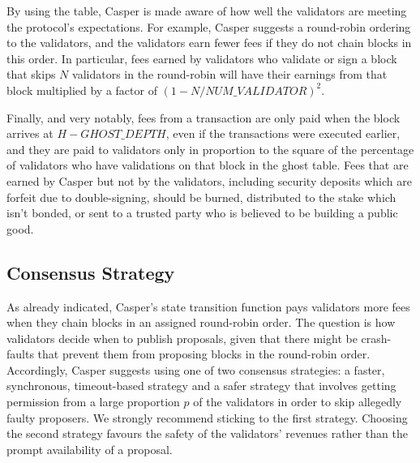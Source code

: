 \documentclass[11pt,a4paper]{article}
\begin{document}
By using the table, Casper is made aware of how well the validators are meeting the protocol's expectations. For example, Casper suggests a round-robin ordering to the validators, and the validators earn fewer fees if they do not chain blocks in this order. In particular, fees earned by validators who validate or sign a block that skips $N$ validators in the round-robin will have their earnings from that block multiplied by a factor of $(1 - N/NUM\_VALIDATOR)^2$. 

Finally, and very notably, fees from a transaction are only paid when the block arrives at $H - GHOST\_DEPTH$, even if the transactions were executed earlier, and they are paid to validators only in proportion to the square of the percentage of validators who have validations on that block in the ghost table. Fees that are earned by Casper but not by the validators, including security deposits which are forfeit due to double-signing, should be burned, distributed to the stake which isn't bonded, or sent to a trusted party who is believed to be building a public good.
 
\subsection{Consensus Strategy}

As already indicated, Casper's state transition function pays validators more fees when they chain blocks in an assigned round-robin order. The question is how validators decide when to publish proposals, given that there might be crash-faults that prevent them from proposing blocks in the round-robin order. Accordingly, Casper suggests using one of two consensus strategies: a faster, synchronous, timeout-based strategy and a safer strategy that involves getting permission from a large proportion $p$ of the validators in order to skip allegedly faulty proposers. We strongly recommend sticking to the first strategy. Choosing the second strategy favours the safety of the validators' revenues rather than the prompt availability of a proposal.
\end{document}
